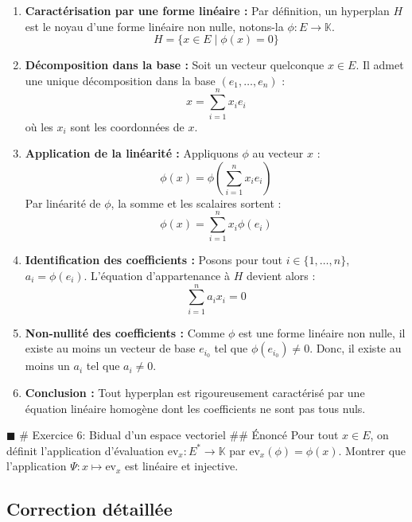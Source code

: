 \begin{enumerate}
\def\labelenumi{\arabic{enumi}.}
\tightlist
\item
  \textbf{Caractérisation par une forme linéaire :} Par définition, un
  hyperplan \(H\) est le noyau d'une forme linéaire non nulle, notons-la
  \(\phi : E \to \mathbb{K}\). \[H = \{ x \in E \mid \phi(x) = 0 \}\]
\item
  \textbf{Décomposition dans la base :} Soit un vecteur quelconque
  \(x \in E\). Il admet une unique décomposition dans la base
  \((e_1, \dots, e_n)\) : \[x = \sum_{i=1}^n x_i e_i\] où les \(x_i\)
  sont les coordonnées de \(x\).
\item
  \textbf{Application de la linéarité :} Appliquons \(\phi\) au vecteur
  \(x\) : \[\phi(x) = \phi\left(\sum_{i=1}^n x_i e_i\right)\] Par
  linéarité de \(\phi\), la somme et les scalaires sortent :
  \[\phi(x) = \sum_{i=1}^n x_i \phi(e_i)\]
\item
  \textbf{Identification des coefficients :} Posons pour tout
  \(i \in \{1, \dots, n\}\), \(a_i = \phi(e_i)\). L'équation
  d'appartenance à \(H\) devient alors : \[\sum_{i=1}^n a_i x_i = 0\]
\item
  \textbf{Non-nullité des coefficients :} Comme \(\phi\) est une forme
  linéaire non nulle, il existe au moins un vecteur de base \(e_{i_0}\)
  tel que \(\phi(e_{i_0}) \neq 0\). Donc, il existe au moins un \(a_i\)
  tel que \(a_i \neq 0\).
\item
  \textbf{Conclusion :} Tout hyperplan est rigoureusement caractérisé
  par une équation linéaire homogène dont les coefficients ne sont pas
  tous nuls.
\end{enumerate}

\(\blacksquare\) \# Exercice 6: Bidual d'un espace vectoriel \#\# Énoncé
Pour tout \(x \in E\), on définit l'application d'évaluation
\(\text{ev}_x : E^* \to \mathbb{K}\) par
\(\text{ev}_x(\phi) = \phi(x)\). Montrer que l'application
\(\Psi : x \mapsto \text{ev}_x\) est linéaire et injective.

\hypertarget{correction-duxe9tailluxe9e-5}{%
\subsection{Correction détaillée}\label{correction-duxe9tailluxe9e-5}}

